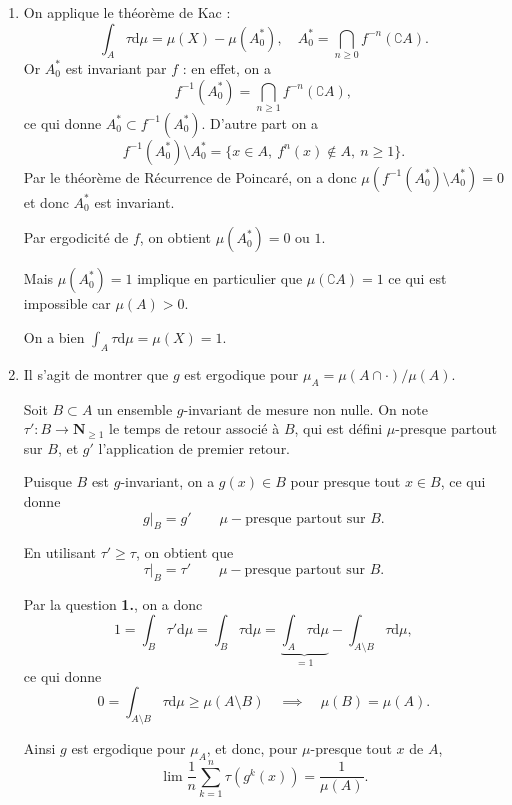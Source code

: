 \documentclass[a4paper,10pt,openany]{article}
\theoremstyle{plain}
\theoremstyle{definition}
\newcommand{\dd}{\mathrm{d}}
\newcommand{\N}{\mathbf{N}}
\begin{document}
\begin{enumerate}
\item On applique le th\'eor\`eme de Kac :
$$
\int_A \tau \dd \mu = \mu(X) - \mu(A_0^*), \quad A_0^* = \bigcap_{n \geqslant 0} f^{-n}(\complement A).
$$
 Or $A_0^*$ est invariant par $f$ : en effet, on a
$$
f^{-1}(A_0^*) = \bigcap_{n \geqslant 1} f^{-n}(\complement A),
$$
 ce qui donne $A_0^* \subset f^{-1}(A_0^*)$. D'autre part on a
$$
f^{-1}(A_0^*) \setminus A_0^* = \{x \in A,~f^n(x) \notin A,~n \geqslant 1\}.
$$
 Par le th\'eor\`eme de R\'ecurrence de Poincar\'e, on a donc $\mu(f^{-1}(A_0^*) \setminus A_0^*) = 0$ et donc $A_0^*$ est invariant.  

Par ergodicit\'e de $f$, on obtient $\mu(A_0^*) = 0$ ou $1$.  

Mais $\mu(A_0^*) = 1$ implique en particulier que $\mu(\complement A) = 1$ ce qui est impossible car $\mu(A) > 0.$  

On a bien $\int_A \tau \dd \mu = \mu(X) = 1.$
\item Il s'agit de montrer que $g$ est ergodique pour $\mu_A = \mu(A \cap \cdot) / \mu(A).$  

Soit $B \subset A$ un ensemble $g$-invariant de mesure non nulle. On note $\tau' : B \to \N_{\geqslant 1}$ le temps de retour associ\'e \`a $B$, qui est d\'efini $\mu$-presque partout sur $B$, et $g'$ l'application de premier retour.  

Puisque $B$ est $g$-invariant, on a $g(x) \in B$ pour presque tout $x \in B$, ce qui donne 
$$
g|_B = g' \quad \quad \mu-\text{presque partout sur }B.
$$ 

En utilisant $\tau' \geqslant \tau$, on obtient que
$$
\tau|_B = \tau' \quad \quad \mu-\text{presque partout sur }B.
$$
 
Par la question \textbf{1.}, on a donc 
$$
1 = \int_B \tau' \dd \mu = \int_B \tau \dd \mu = \underset{=1}{\underbrace{\int_A \tau \dd \mu}} - \int_{A \setminus B} \tau \dd \mu,
$$
 ce qui donne 
$$
0 = \int_{A\setminus B}\tau \dd \mu \geqslant \mu(A \setminus B) \quad \implies \quad \mu(B) = \mu(A).
$$



Ainsi $g$ est ergodique pour $\mu_A$, et donc, pour $\mu$-presque tout $x$ de $A$,
$$
\lim \frac{1}{n} \sum_{k=1}^n \tau\left(g^k(x)\right) = \frac{1}{\mu(A)}.
$$

\end{enumerate}
\end{document}
